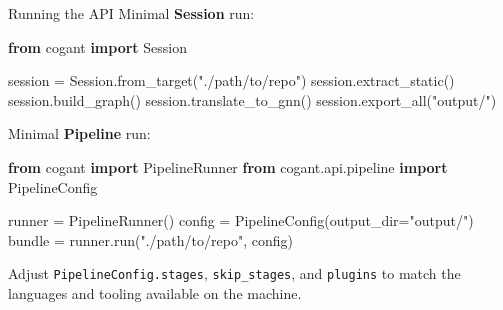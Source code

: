 \documentclass[
  ignorenonframetext,
]{beamer}
\newenvironment{Shaded}{}{}
\newcommand{\ImportTok}[1]{\textcolor[rgb]{0.00,0.50,0.00}{\textbf{#1}}}
\newcommand{\NormalTok}[1]{#1}
\newcommand{\OperatorTok}[1]{\textcolor[rgb]{0.40,0.40,0.40}{#1}}
\newcommand{\StringTok}[1]{\textcolor[rgb]{0.25,0.44,0.63}{#1}}
\begin{document}
\begin{frame}[fragile]{Running the API}
\protect{}\label{running-the-api}
Minimal \textbf{Session} run:

\begin{Shaded}
\begin{Highlighting}[]
\ImportTok{from}\NormalTok{ cogant }\ImportTok{import}\NormalTok{ Session}

\NormalTok{session }\OperatorTok{=}\NormalTok{ Session.from\_target(}\StringTok{"./path/to/repo"}\NormalTok{)}
\NormalTok{session.extract\_static()}
\NormalTok{session.build\_graph()}
\NormalTok{session.translate\_to\_gnn()}
\NormalTok{session.export\_all(}\StringTok{"output/"}\NormalTok{)}
\end{Highlighting}
\end{Shaded}

Minimal \textbf{Pipeline} run:

\begin{Shaded}
\begin{Highlighting}[]
\ImportTok{from}\NormalTok{ cogant }\ImportTok{import}\NormalTok{ PipelineRunner}
\ImportTok{from}\NormalTok{ cogant.api.pipeline }\ImportTok{import}\NormalTok{ PipelineConfig}

\NormalTok{runner }\OperatorTok{=}\NormalTok{ PipelineRunner()}
\NormalTok{config }\OperatorTok{=}\NormalTok{ PipelineConfig(output\_dir}\OperatorTok{=}\StringTok{"output/"}\NormalTok{)}
\NormalTok{bundle }\OperatorTok{=}\NormalTok{ runner.run(}\StringTok{"./path/to/repo"}\NormalTok{, config)}
\end{Highlighting}
\end{Shaded}

Adjust \texttt{PipelineConfig.stages}, \texttt{skip\_stages}, and
\texttt{plugins} to match the languages and tooling available on the
machine.
\end{frame}
\end{document}

